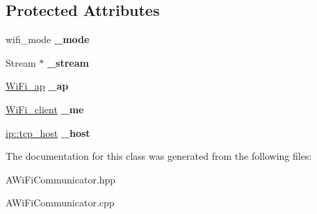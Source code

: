 \subsection*{Protected Attributes}
\begin{DoxyCompactItemize}
\item 
\mbox{\label{classwood_box_1_1communication_1_1wifi_1_1_a_wi_fi_communicator_ac07f090eb75730353a78f2d26f2095f1}} 
wifi\+\_\+mode {\bfseries \+\_\+mode}
\item 
\mbox{\label{classwood_box_1_1communication_1_1wifi_1_1_a_wi_fi_communicator_a297970584d8120015f898afa1278eb46}} 
Stream $\ast$ {\bfseries \+\_\+stream}
\item 
\mbox{\label{classwood_box_1_1communication_1_1wifi_1_1_a_wi_fi_communicator_a9d2cdaede0b5e5040867c3d428dd98f0}} 
\mbox{\hyperlink{structwood_box_1_1communication_1_1wifi_1_1s__wifi__access__point}{Wi\+Fi\+\_\+ap}} {\bfseries \+\_\+ap}
\item 
\mbox{\label{classwood_box_1_1communication_1_1wifi_1_1_a_wi_fi_communicator_afde4ef66d5296fbeeff2e1b333105bec}} 
\mbox{\hyperlink{structwood_box_1_1communication_1_1wifi_1_1s__wifi__client}{Wi\+Fi\+\_\+client}} {\bfseries \+\_\+me}
\item 
\mbox{\label{classwood_box_1_1communication_1_1wifi_1_1_a_wi_fi_communicator_ace744bc5d2c8f66dcd735029b129dea6}} 
\mbox{\hyperlink{structwood_box_1_1communication_1_1ip_1_1s__host}{ip\+::tcp\+\_\+host}} {\bfseries \+\_\+host}
\end{DoxyCompactItemize}


The documentation for this class was generated from the following files\+:\begin{DoxyCompactItemize}
\item 
A\+Wi\+Fi\+Communicator.\+hpp\item 
A\+Wi\+Fi\+Communicator.\+cpp\end{DoxyCompactItemize}
